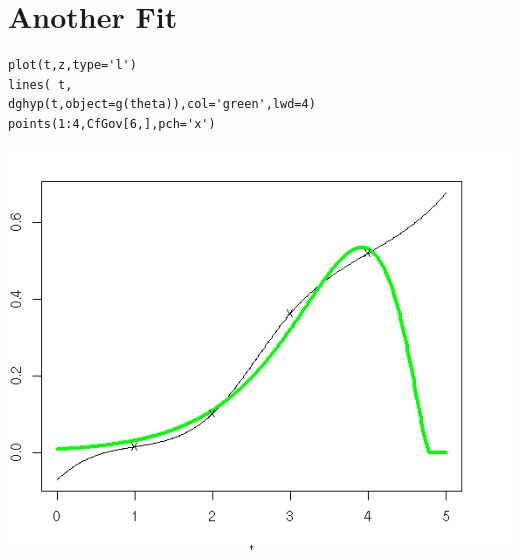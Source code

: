 \documentclass{amsart}
\begin{document}
\section{Another Fit}

\begin{verbatim}
plot(t,z,type='l')
lines( t,
dghyp(t,object=g(theta)),col='green',lwd=4)
points(1:4,CfGov[6,],pch='x')
\end{verbatim}

\includegraphics[scale=0.8]{fit_cfgovt6.png}
\end{document}
